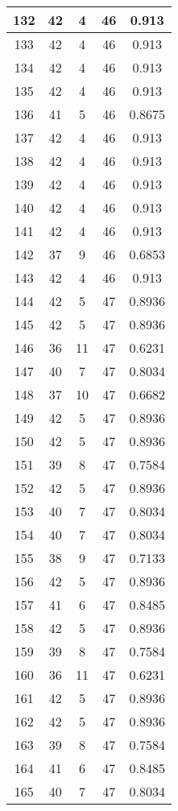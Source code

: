 \documentclass[letterpaper, 12pt]{article}
\begin{document}
\begin{longtable}{|c|c|c|c|c|}
\hline
132 & 42 & 4 & 46 & 0.913 \\
\hline
133 & 42 & 4 & 46 & 0.913 \\
\hline
134 & 42 & 4 & 46 & 0.913 \\
\hline
135 & 42 & 4 & 46 & 0.913 \\
\hline
136 & 41 & 5 & 46 & 0.8675 \\
\hline
137 & 42 & 4 & 46 & 0.913 \\
\hline
138 & 42 & 4 & 46 & 0.913 \\
\hline
139 & 42 & 4 & 46 & 0.913 \\
\hline
140 & 42 & 4 & 46 & 0.913 \\
\hline
141 & 42 & 4 & 46 & 0.913 \\
\hline
142 & 37 & 9 & 46 & 0.6853 \\
\hline
143 & 42 & 4 & 46 & 0.913 \\
\hline
144 & 42 & 5 & 47 & 0.8936 \\
\hline
145 & 42 & 5 & 47 & 0.8936 \\
\hline
146 & 36 & 11 & 47 & 0.6231 \\
\hline
147 & 40 & 7 & 47 & 0.8034 \\
\hline
148 & 37 & 10 & 47 & 0.6682 \\
\hline
149 & 42 & 5 & 47 & 0.8936 \\
\hline
150 & 42 & 5 & 47 & 0.8936 \\
\hline
151 & 39 & 8 & 47 & 0.7584 \\
\hline
152 & 42 & 5 & 47 & 0.8936 \\
\hline
153 & 40 & 7 & 47 & 0.8034 \\
\hline
154 & 40 & 7 & 47 & 0.8034 \\
\hline
155 & 38 & 9 & 47 & 0.7133 \\
\hline
156 & 42 & 5 & 47 & 0.8936 \\
\hline
157 & 41 & 6 & 47 & 0.8485 \\
\hline
158 & 42 & 5 & 47 & 0.8936 \\
\hline
159 & 39 & 8 & 47 & 0.7584 \\
\hline
160 & 36 & 11 & 47 & 0.6231 \\
\hline
161 & 42 & 5 & 47 & 0.8936 \\
\hline
162 & 42 & 5 & 47 & 0.8936 \\
\hline
163 & 39 & 8 & 47 & 0.7584 \\
\hline
164 & 41 & 6 & 47 & 0.8485 \\
\hline
165 & 40 & 7 & 47 & 0.8034 \\

\end{longtable}
\end{document}
